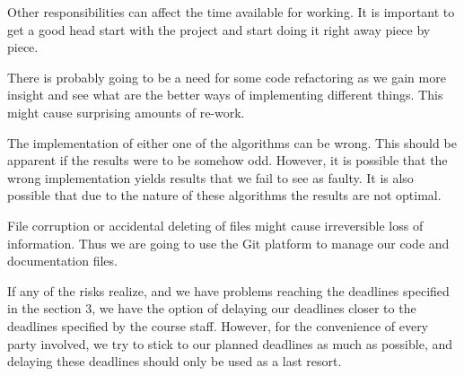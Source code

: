 \documentclass[twoside]{article}
\begin{document}
\begin{multicols}{2}
Other responsibilities can affect the time available for working. It is important to get a good head start with the project and start doing it right away piece by piece.

There is probably going to be a need for some code refactoring as we gain more insight and see what are the better ways of implementing different things. This might cause surprising amounts of re-work.

The implementation of either one of the algorithms can be wrong. This should be apparent if the results were to be somehow odd. However, it is possible that the wrong implementation yields results that we fail to see as faulty. It is also possible that due to the nature of these algorithms the results are not optimal.

File corruption or accidental deleting of files might cause irreversible loss of information. Thus we are going to use the Git platform to manage our code and documentation files.

If any of the risks realize, and we have problems reaching the deadlines specified in the section 3, we have the option of delaying our deadlines closer to the deadlines specified by the course staff. However, for the convenience of every party involved, we try to stick to our planned deadlines as much as possible, and delaying these deadlines should only be used as a last resort.


 


\end{multicols}
\end{document}
